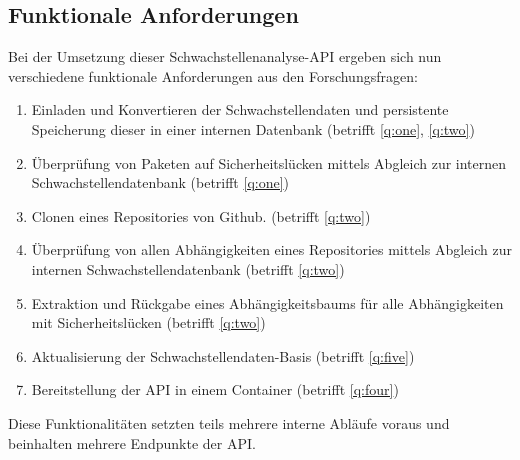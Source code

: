 \subsection{Funktionale Anforderungen} \label{sec:Funktionale_Anforderungen}
    Bei der Umsetzung dieser Schwachstellenanalyse-\ac{API} ergeben sich nun verschiedene funktionale Anforderungen aus den Forschungsfragen:
    \begin{enumerate}[label=\textbf{FRQ-\Roman*}, leftmargin=2.5cm]
        \item Einladen und Konvertieren der Schwachstellendaten und persistente Speicherung dieser in einer internen Datenbank (betrifft \ref{q:one}, \ref{q:two})\label{f:one}
        \item Überprüfung von Paketen auf Sicherheitslücken mittels Abgleich zur internen Schwachstellendatenbank (betrifft \ref{q:one}) \label{f:two}
        \item Clonen eines Repositories von Github. (betrifft \ref{q:two}) \label{f:three}
        \item Überprüfung von allen Abhängigkeiten eines Repositories mittels Abgleich zur internen Schwachstellendatenbank (betrifft \ref{q:two}) \label{f:four}
        \item Extraktion und Rückgabe eines Abhängigkeitsbaums für alle Abhängigkeiten mit Sicherheits\-lücken (betrifft \ref{q:two}) \label{f:five}
        \item Aktualisierung der Schwachstellendaten-Basis (betrifft \ref{q:five}) \label{f:six}
        \item Bereitstellung der \ac{API} in einem Container (betrifft \ref{q:four}) \label{f:seven}
    \end{enumerate}
    Diese Funktionalitäten setzten teils mehrere interne Abläufe voraus und beinhalten mehrere Endpunkte der \ac{API}.
